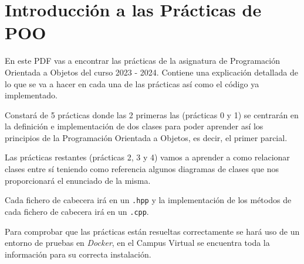 \thispagestyle{empty}
\cleardoublepage
\chapter*{Introducción a las Prácticas de POO}

En este PDF vas a encontrar las prácticas de la asignatura de Programación Orientada a Objetos
del curso 2023 - 2024.
Contiene una explicación detallada de lo que se va a hacer en cada una de las prácticas así
como el código ya implementado.

Constará de 5 prácticas donde las 2 primeras las (prácticas 0 y 1) se centrarán
en la definición e implementación de dos clases para poder aprender así los 
principios de la Programación Orientada a Objetos, es decir, el primer parcial.

Las prácticas restantes (prácticas 2, 3 y 4) vamos a aprender a como relacionar clases
entre sí teniendo como referencia algunos diagramas de clases que nos proporcionará
el enunciado de la misma.

Cada fichero de cabecera irá en un \texttt{.hpp} y la implementación de los métodos de 
cada fichero de cabecera irá en un \texttt{.cpp}.

Para comprobar que las prácticas están resueltas correctamente se hará uso de un
entorno de pruebas en \textit{Docker}, en el Campus Virtual se encuentra toda la información
para su correcta instalación.